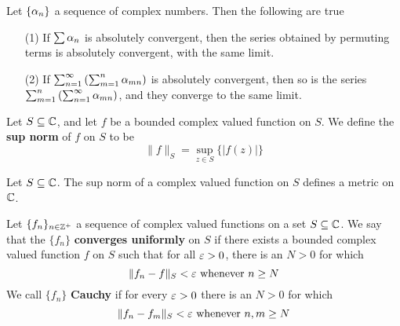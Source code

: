 \begin{lemma}\label{2.2.4}
    Let $\{\alpha_n\}$ a sequence of complex numbers. Then the following are true
    \begin{enumerate}
        \item[(1)] If $\sum{\alpha_n}$ is absolutely convergent, then the series
            obtained by permuting terms is absolutely convergent, with the same
            limit.

        \item[(2)] If $\sum_{n=1}^\infty{(\sum_{m=1}^n{\alpha_{mn}})}$ is absolutely
            convergent, then so is the series
            $\sum_{m=1}^n{(\sum_{n=1}^\infty{\alpha_{mn}})}$, and they converge to
            the same limit.
    \end{enumerate}
\end{lemma}

\begin{definition}
    Let $S \subseteq \mathbb{C}$, and let $f$ be a bounded complex valued function on
    $S$. We define the \textbf{sup norm} of $f$ on  $S$ to be
    \begin{equation*}
        \|f\|_S=\sup_{z \in S}{\{|f(z)|\}}
    \end{equation*}
\end{definition}

\begin{lemma}\label{2.2.5}
    Let $S \subseteq \mathbb{C}$. The sup norm of a complex valued function on $S$
    defines a metric on $\mathbb{C}$.
\end{lemma}

\begin{definition}
    Let $\{f_n\}_{n \in \mathbb{Z}^+}$ a sequence of complex valued functions on a set
    $S \subseteq \mathbb{C}$. We say that the  $\{f_n\}$ \textbf{converges uniformly} on
    $S$ if there exists a bounded complex valued function $f$ on $S$ such that
    for all $\varepsilon>0$, there is an $N>0$ for which
    \begin{equation*}
        \|f_n-f\|_S<\varepsilon \text{ whenever } n \geq N
    \end{equation*}
    We call $\{f_n\}$ \textbf{Cauchy} if for every $\varepsilon>0$ there is an  $N>0$ for
    which
    \begin{equation*}
        \|f_n-f_m\|_S<\varepsilon \text{ whenever } n,m \geq N
    \end{equation*}
\end{definition}

